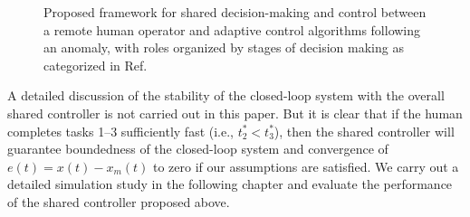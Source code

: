 \begin{figure}[h]

	\caption{Proposed framework for shared decision-making and control between a remote human operator and adaptive control algorithms following an anomaly, with roles organized by stages of decision making as categorized in Ref.~\cite{parasuraman2000model}}
	\label{fig:response_flow_remote}
\end{figure}

A detailed discussion of the stability of the closed-loop system with the overall shared controller is not carried out in this paper. But it is clear that if the human completes tasks 1--3 sufficiently fast (i.e., $t_2^* < t_3^*$), then the shared controller will guarantee boundedness of the closed-loop system and convergence of $e(t) = x(t) - x_m(t)$ to zero if our assumptions are satisfied. We carry out a detailed simulation study in the following chapter and evaluate the performance of the shared controller proposed above.
